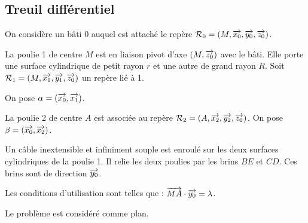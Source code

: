 \documentclass[10pt]{article}
\begin{document}
\subsection*{Treuil différentiel}
\begin{minipage}[c]{.65\linewidth}
On considère un bâti 0 auquel est attaché le repère $\mathcal{R}_0 = \left(M,\overrightarrow{x_0},\overrightarrow{y_0},\overrightarrow{z_0}\right)$.

La poulie 1 de centre $M$ est en liaison pivot d'axe $\left(M,\overrightarrow{z_0}\right)$  avec le bâti. Elle porte une surface cylindrique de petit rayon $r$ et une autre de grand rayon $R$. Soit $\mathcal{R}_1 = \left(M,\overrightarrow{x_1},\overrightarrow{y_1},\overrightarrow{z_0}\right)$ un repère lié à 1.

On pose $\alpha=\left(\overrightarrow{x_0},\overrightarrow{x_1}\right)$.

La poulie 2 de centre $A$ est associée au repère $\mathcal{R}_2 = \left(A,\overrightarrow{x_2},\overrightarrow{y_2},\overrightarrow{z_0}\right)$. On pose $\beta=\left(\overrightarrow{x_0},\overrightarrow{x_2}\right)$.

Un câble inextensible et infiniment souple est enroulé sur les deux surfaces cylindriques de la poulie 1. Il relie les deux poulies par les brins $BE$ et $CD$. Ces brins sont de direction $\overrightarrow{y_0}$.

Les conditions d'utilisation sont telles que : $\overrightarrow{MA}\cdot \overrightarrow{y_0} = \lambda$.

Le problème est considéré comme plan.
\end{minipage}\hfill
\end{document}
